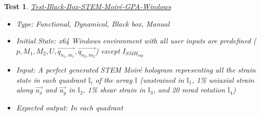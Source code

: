 \documentclass[12pt, titlepage]{article}
\newtheorem{Test}{Test}
\begin{document}
\begin{Test}\normalfont\underline{Test-Black-Box-STEM-Moir{\'e}-GPA-Windows}
\label{black_box_STEM_Moire_GPA-predif-Windows}
\begin{itemize}
\item Type: Functional, Dynamical, Black box, Manual
\item Initial State: x64 Windows environment with all user inputs are predefined ($p,M_1,M_2,U,\overrightarrow{q_{n_1,m_1}},\overrightarrow{q_{n_2,m_2}}$) except $I_{\mathit{SMH}_\text{exp}}$ 
\item Input: A perfect generated STEM Moir{\'e} hologram representing all the strain state in each quadrant $\mathbb{I}_{i}$ of the array $\mathbb{I}$ (unstrained in $\mathbb{I}_{1}$, 1{\%} uniaxial strain along $\vec{u_x}$ and $\vec{u_y}$ in $\mathbb{I}_{2}$, 1{\%} shear strain in $\mathbb{I}_{3}$, and  20 mrad rotation $\mathbb{I}_{4}$)
\item Expected output: In each quadrant
\end{itemize}
\end{Test}
\end{document}
